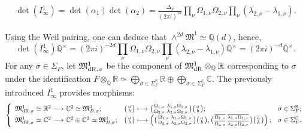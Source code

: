 \documentclass{amsart}
\theoremstyle{definition}
\theoremstyle{remark}
\numberwithin{equation}{section}
\newcommand{\mfM}{{\mathfrak M}}
\newcommand{\Q}{{\mathbb Q}}
\newcommand{\C}{{\mathbb C}}
\newcommand{\R}{{\mathbb R}}
\begin{document}
    \begin{eqnarray*}
    \det (I_{\infty}^1)=\det(\alpha_1)\det(\alpha_2)=\frac{\Delta_F}{(2\pi i)^{2d}}\prod_{\nu}\Omega_{1,{\nu}}\Omega_{2,{\nu}}\prod_{{\nu}}(\lambda_{2,{\nu}}-\lambda_{1,{\nu}}).
    \end{eqnarray*}
    
Using the Weil pairing, one can deduce that $\wedge^{2d}\mfM^1\simeq \Q(d)$, hence,
    \begin{equation}\label{relationlambdaomega}
\det( I^1_{\infty})\Q^\times=(2\pi i)^{-2d}\prod_{\nu}\Omega_{1,{\nu}}\Omega_{2,{\nu}}\prod_{{\nu}}(\lambda_{2,{\nu}}-\lambda_{1,{\nu}})\Q^\times=(2\pi i)^{-d}\Q^\times.
    \end{equation}
For any $\sigma\in\Sigma_F$, let $\mfM^1_{{\rm dR},\sigma}$ be the component of $\mfM^1_{\rm dR}\otimes_\Q\R$ corresponding to $\sigma$ under the identification $F\otimes_\Q\R\simeq\bigoplus_{\sigma\in\Sigma_F^\R}\R\oplus\bigoplus_{\sigma\in\Sigma_F^\C}\C$. The previously introduced  $I^1_{\infty}$ provides morphisms:
    \[
    \left\{\begin{array}{lll}\mfM^1_{\rm dR,\sigma}\simeq \R^2\longrightarrow\C^2\simeq \mfM^1_{B,\sigma};& \big(\begin{smallmatrix}a\\b\end{smallmatrix}\big)\longmapsto\big(\begin{smallmatrix}
        \Omega_{1,\sigma}&\lambda_{1,\sigma}\Omega_{1,\sigma}\\\Omega_{2,\sigma}&\lambda_{2,\sigma}\Omega_{2,\sigma}
    \end{smallmatrix}\big)\big(\begin{smallmatrix}a\\b\end{smallmatrix}\big);&\sigma\in\Sigma_F^\R;\\
    \mfM^1_{\rm dR,\sigma}\simeq \C^2\longrightarrow\C^2\oplus\C^2\simeq \mfM^1_{B,\sigma};&\big(\begin{smallmatrix}a\\b\end{smallmatrix}\big)\longmapsto\left(\big(\begin{smallmatrix}
        \Omega_{1,\sigma}&\lambda_{1,\sigma}\Omega_{1,\sigma}\\\Omega_{2,\sigma}&\lambda_{2,\sigma}\Omega_{2,\sigma}
\end{smallmatrix}\big)\big(\begin{smallmatrix}a\\b\end{smallmatrix}\big),\big(\begin{smallmatrix}
\overline{\Omega_{1,\sigma}}&\overline{\lambda_{1,\sigma}}\overline{\Omega_{1,\sigma}}\\\overline{\Omega_{2,\sigma}}&\overline{\lambda_{2,\sigma}}\overline{\Omega_{2,\sigma}}
\end{smallmatrix}\big)\big(\begin{smallmatrix}\bar a\\\bar b\end{smallmatrix}\big)\right);&\sigma\in\Sigma_F^\C.\end{array}\right.
    \]
\end{document}

